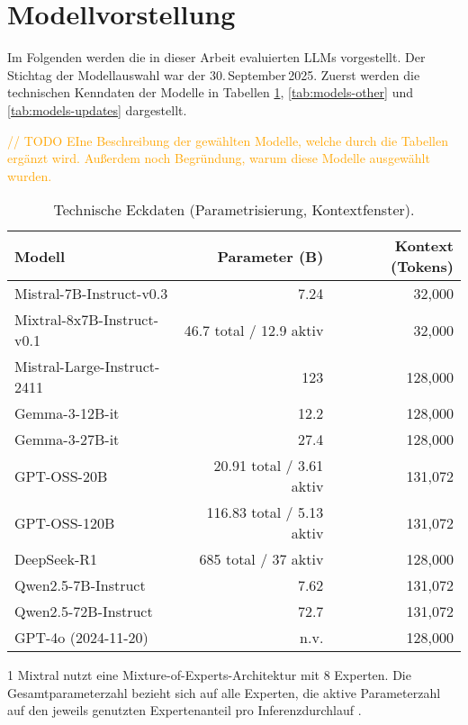 \section{Modellvorstellung}\label{sec:modellvorstellung}

Im Folgenden werden die in dieser Arbeit evaluierten \acp{LLM} vorgestellt. Der Stichtag der Modellauswahl war der 30.\,September\,2025. Zuerst werden die technischen Kenndaten der Modelle in Tabellen \ref{tab:models-tech}, \ref{tab:models-other} und \ref{tab:models-updates} dargestellt.

\textcolor{orange}{// TODO EIne Beschreibung der gewählten Modelle, welche durch die Tabellen ergänzt wird. Außerdem noch Begründung, warum diese Modelle ausgewählt wurden.}

\begin{table}[htbp]
    \centering
    \begin{threeparttable}
    \caption{Technische Eckdaten (Parametrisierung, Kontextfenster).}
    \label{tab:models-tech}
    \begin{tabular}{lrr}
        \toprule
        \textbf{Modell} & \textbf{Parameter (B)} & \textbf{Kontext (Tokens)} \\
        \midrule
        Mistral-7B-Instruct-v0.3 & 7.24 & 32{,}000 \cite{HF_Mistral7B_2025} \\
        Mixtral-8x7B-Instruct-v0.1 & 46.7 total / 12.9 aktiv\tnote{1} & 32{,}000 \cite{HF_Mixtral8x7B_2025,Mixtral_Blog} \\
        Mistral-Large-Instruct-2411 & 123 & 128{,}000 \cite{HF_MistralLargeInstruct_2025} \\
        \midrule
        Gemma-3-12B-it & 12.2 & 128{,}000 \cite{HF_Gemma3_12B_2025} \\
        Gemma-3-27B-it & 27.4 & 128{,}000 \cite{HF_Gemma3_27B_2025} \\
        \midrule
        GPT-OSS-20B & 20.91 total / 3.61 aktiv & 131{,}072 \cite{OpenAI_GPTOSS_ModelCard_2025} \\
        GPT-OSS-120B & 116.83 total / 5.13 aktiv & 131{,}072 \cite{OpenAI_GPTOSS_ModelCard_2025} \\
        \midrule
        DeepSeek-R1 & 685 total / 37 aktiv & 128{,}000 \cite{HF_DeepSeekR1_2025} \\
        \midrule
        Qwen2.5-7B-Instruct & 7.62 & 131{,}072 \cite{HF_Qwen7B_2025} \\
        Qwen2.5-72B-Instruct & 72.7 & 131{,}072 \cite{HF_Qwen72B_2025} \\
        \midrule
        GPT-4o (2024-11-20) & n.v. & 128{,}000 \cite{openai-hello-gpt-4o} \\
        \bottomrule
    \end{tabular}
    \begin{tablenotes}
        \item[1] Mixtral nutzt eine Mixture-of-Experts-Architektur mit 8 Experten. Die Gesamtparameterzahl bezieht sich auf alle Experten, die aktive Parameterzahl auf den jeweils genutzten Expertenanteil pro Inferenzdurchlauf \cite{Mixtral_Blog}.
    \end{tablenotes}
    \end{threeparttable}
\end{table}

